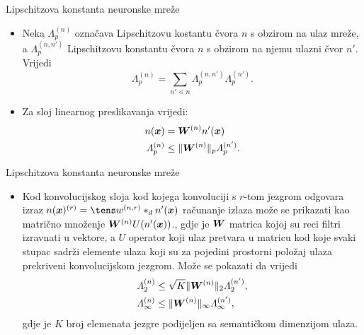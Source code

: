 \documentclass{beamer}
\begin{document}
\begin{frame}{Lipschitzova konstanta neuronske mreže}
\begin{itemize}
	\item Neka $\Lambda_p^{(n)}$ označava Lipschitzovu kostantu čvora $n$ s obzirom na ulaz mreže, a $\Lambda_p^{(n,n')}$ Lipschitzovu konstantu čvora $n$ s obzirom na njemu ulazni čvor $n'$. Vrijedi
	\begin{equation}
	\Lambda_p^{(n)} = \sum_{n'\lessdot n}
	\Lambda_p^{(n,n')}\Lambda_p^{(n')}.
	\end{equation}
	
	\item Za sloj linearnog preslikavanja vrijedi: 
	\begin{align}
	n(\vec x) &= \mat W^{(n)}n'(\vec x) \\
	\Lambda_p^{(n)} &\leq \lVert \mat W^{(n)}\rVert_p\Lambda_p^{(n')}.
	\end{align}
\end{itemize}
\end{frame}

\begin{frame}{Lipschitzova konstanta neuronske mreže}
\begin{itemize}
	\item Kod konvolucijskog sloja kod kojega konvoluciji s $r$-tom jezgrom odgovara izraz $n(\vec x)^{(r)} = \tens w^{(n,r)}*_d n'(\vec x)$ računanje izlaza može se prikazati kao matrično množenje $\mat W^{(n)}U(n'(\vec x))$., gdje je $\mat W$ matrica kojoj su reci filtri izravnati u vektore, a $U$ operator koji ulaz pretvara u matricu kod koje svaki stupac sadrži elemente ulaza koji su za pojedini prostorni položaj ulaza prekriveni konvolucijskom jezgrom. Može se pokazati da vrijedi
	\begin{align} \label{eq:konv-lipschitz}
	\Lambda_2^{(n)} &\leq \sqrt{K} \lVert \mat W^{(n)}\rVert_2\Lambda_2^{(n')}, \\ \Lambda_\infty^{(n)} &\leq \lVert \mat W^{(n)}\rVert_\infty\Lambda_\infty^{(n')},
	\end{align}
	gdje je $K$ broj elemenata jezgre podijeljen sa semantičkom dimenzijom ulaza. 
\end{itemize}
\end{frame}
\end{document}
